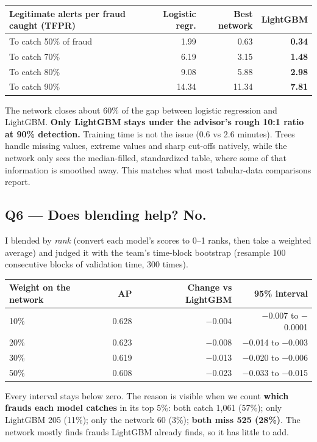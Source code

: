 \documentclass[11pt]{article}
\begin{document}
\begin{center}
\begin{tabular}{@{}lrrr@{}}
\toprule
\textbf{Legitimate alerts per fraud caught (TFPR)} & \textbf{Logistic regr.} & \textbf{Best network} & \textbf{LightGBM} \\
\midrule
To catch 50\% of fraud & 1.99 & 0.63 & \textbf{0.34} \\
To catch 70\% & 6.19 & 3.15 & \textbf{1.48} \\
To catch 80\% & 9.08 & 5.88 & \textbf{2.98} \\
To catch 90\% & 14.34 & 11.34 & \textbf{7.81} \\
\bottomrule
\end{tabular}
\end{center}
The network closes about 60\% of the gap between logistic regression and LightGBM. \textbf{Only LightGBM stays under the advisor's rough 10:1 ratio at 90\% detection.} Training time is not the issue (0.6 vs 2.6 minutes). Trees handle missing values, extreme values and sharp cut-offs natively, while the network only sees the median-filled, standardized table, where some of that information is smoothed away. This matches what most tabular-data comparisons report.

\subsection{Q6 --- Does blending help? \textcolor{amber}{No.}}
I blended by \emph{rank} (convert each model's scores to 0--1 ranks, then take a weighted average) and judged it with the team's time-block bootstrap (resample 100 consecutive blocks of validation time, 300 times).

\begin{center}
\begin{tabular}{@{}lrrr@{}}
\toprule
\textbf{Weight on the network} & \textbf{AP} & \textbf{Change vs LightGBM} & \textbf{95\% interval} \\
\midrule
10\% & 0.628 & $-$0.004 & $-$0.007 to $-$0.0001 \\
20\% & 0.623 & $-$0.008 & $-$0.014 to $-$0.003 \\
30\% & 0.619 & $-$0.013 & $-$0.020 to $-$0.006 \\
50\% & 0.608 & $-$0.023 & $-$0.033 to $-$0.015 \\
\bottomrule
\end{tabular}
\end{center}
Every interval stays below zero. The reason is visible when we count \textbf{which frauds each model catches} in its top 5\%: both catch 1,061 (57\%); only LightGBM 205 (11\%); only the network 60 (3\%); \textbf{both miss 525 (28\%)}. The network mostly finds frauds LightGBM already finds, so it has little to add.
\end{document}
